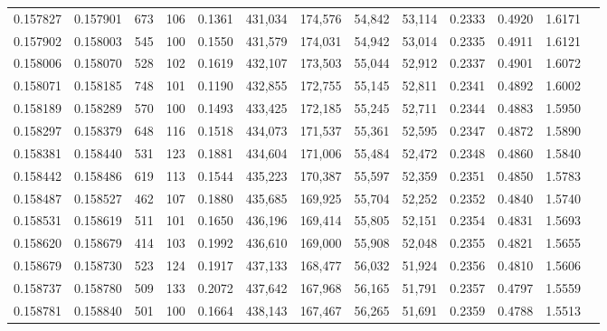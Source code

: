 \begin{tabular}{rrrrrrrrrrrrr}
0.157827 & 0.157901 &   673 & 106 &                                     0.1361 & 431,034 & 174,576 &  54,842 &  53,114 & 0.2333 & 0.4920 & 1.6171 \\
0.157902 & 0.158003 &   545 & 100 &                                     0.1550 & 431,579 & 174,031 &  54,942 &  53,014 & 0.2335 & 0.4911 & 1.6121 \\
0.158006 & 0.158070 &   528 & 102 &                                     0.1619 & 432,107 & 173,503 &  55,044 &  52,912 & 0.2337 & 0.4901 & 1.6072 \\
0.158071 & 0.158185 &   748 & 101 &                                     0.1190 & 432,855 & 172,755 &  55,145 &  52,811 & 0.2341 & 0.4892 & 1.6002 \\
0.158189 & 0.158289 &   570 & 100 &                                     0.1493 & 433,425 & 172,185 &  55,245 &  52,711 & 0.2344 & 0.4883 & 1.5950 \\
0.158297 & 0.158379 &   648 & 116 &                                     0.1518 & 434,073 & 171,537 &  55,361 &  52,595 & 0.2347 & 0.4872 & 1.5890 \\
0.158381 & 0.158440 &   531 & 123 &                                     0.1881 & 434,604 & 171,006 &  55,484 &  52,472 & 0.2348 & 0.4860 & 1.5840 \\
0.158442 & 0.158486 &   619 & 113 &                                     0.1544 & 435,223 & 170,387 &  55,597 &  52,359 & 0.2351 & 0.4850 & 1.5783 \\
0.158487 & 0.158527 &   462 & 107 &                                     0.1880 & 435,685 & 169,925 &  55,704 &  52,252 & 0.2352 & 0.4840 & 1.5740 \\
0.158531 & 0.158619 &   511 & 101 &                                     0.1650 & 436,196 & 169,414 &  55,805 &  52,151 & 0.2354 & 0.4831 & 1.5693 \\
0.158620 & 0.158679 &   414 & 103 &                                     0.1992 & 436,610 & 169,000 &  55,908 &  52,048 & 0.2355 & 0.4821 & 1.5655 \\
0.158679 & 0.158730 &   523 & 124 &                                     0.1917 & 437,133 & 168,477 &  56,032 &  51,924 & 0.2356 & 0.4810 & 1.5606 \\
0.158737 & 0.158780 &   509 & 133 &                                     0.2072 & 437,642 & 167,968 &  56,165 &  51,791 & 0.2357 & 0.4797 & 1.5559 \\
0.158781 & 0.158840 &   501 & 100 &                                     0.1664 & 438,143 & 167,467 &  56,265 &  51,691 & 0.2359 & 0.4788 & 1.5513 \\

\end{tabular}
